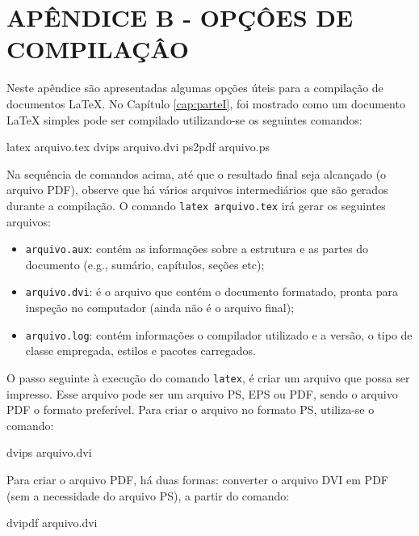 \hypertarget{estilo:apendice1}{}
\renewcommand{\thechapter}{}
\chapter{APÊNDICE B - OPÇÔES DE COMPILAÇÂO}
\label{apendiceB} 
\renewcommand{\thechapter}{B} 

Neste apêndice são apresentadas algumas opções úteis para a compilação de documentos \LaTeX{}. No Capítulo \ref{cap:parteI}, foi mostrado como um documento \LaTeX{} simples pode ser compilado utilizando-se os seguintes comandos:

\begin{meucomando}
latex arquivo.tex 
dvips arquivo.dvi
ps2pdf arquivo.ps
\end{meucomando}

Na sequência de comandos acima, até que o resultado final seja alcançado (o arquivo PDF), observe que há vários arquivos intermediários que são gerados durante a compilação. O comando {\tt latex arquivo.tex} irá gerar os seguintes arquivos:

\begin{itemize}
  \item {\tt arquivo.aux}: contém as informações sobre a estrutura e as partes do documento (e.g., sumário, capítulos, seções etc);
  \item {\tt arquivo.dvi}: é o arquivo que contém o documento formatado, pronta para inspeção no computador (ainda não é o arquivo final);
  \item {\tt arquivo.log}: contém informações o compilador utilizado e a versão, o tipo de classe empregada, estilos e pacotes carregados.
\end{itemize}

O passo seguinte à execução do comando {\tt latex}, é criar um arquivo que possa ser impresso. Esse arquivo pode ser um arquivo PS, EPS ou PDF, sendo o arquivo PDF o formato preferível. Para criar o arquivo no formato PS, utiliza-se o comando:

\begin{meucomando}
dvips arquivo.dvi 
\end{meucomando}

Para criar o arquivo PDF, há duas formas: converter o arquivo DVI em PDF (sem a necessidade do arquivo PS), a partir do comando: 

\begin{meucomando}
dvipdf arquivo.dvi 
\end{meucomando}

